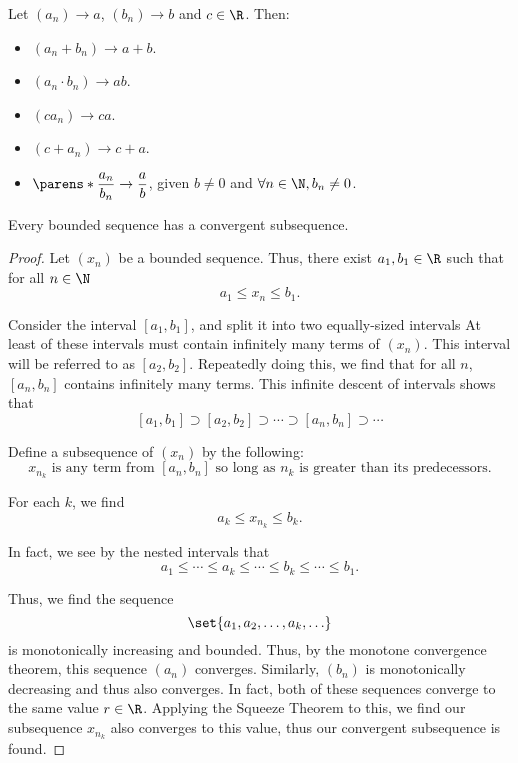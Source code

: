\documentclass{article}
\begin{document}
\begin{theorem}
  Let $(a_{n}) \to a$, $(b_{n}) \to b$ and $c \in \R$.
  Then:
  \begin{itemize}
    \item $(a_{n} + b_{n}) \to a + b$.
    \item $(a_{n} \cdot b_{n}) \to ab$.
    \item $(ca_{n}) \to ca$.
    \item $(c + a_{n}) \to c + a$.
    \item $\parens*{\dfrac{a_{n}}{b_{n}}} \to \dfrac{a}{b}$, given $b \ne 0$ and $\forall n \in \N, b_{n} \ne 0$.
  \end{itemize}

\end{theorem}

\begin{theorem}
  Every bounded sequence has a convergent subsequence.

  \begin{proof}
    Let $(x_{n})$ be a bounded sequence.
    Thus, there exist $a_{1}, b_{1} \in \R$ such that for all $n \in \N$
    \[
      a_{1} \le x_{n} \le b_{1}.
    \]

    Consider the interval $[a_{1}, b_{1}]$, and split it into two equally-sized intervals
    At least of these intervals must contain infinitely many terms of $(x_{n})$.
    This interval will be referred to as $[a_{2}, b_{2}]$.
    Repeatedly doing this, we find that for all $n$, $[a_{n}, b_{n}]$ contains infinitely many terms.
    This infinite descent of intervals shows that
    \[
      [a_{1}, b_{1}] \supset [a_{2}, b_{2}] \supset \cdots \supset [a_{n}, b_{n}] \supset \cdots
    \]

    Define a subsequence of $(x_{n})$ by the following:
    \[
      x_{n_{k}} \textrm{ is any term from } [a_{n}, b_{n}] \textrm{ so long as } n_{k} \textrm { is greater than its predecessors}.
    \]

    For each $k$, we find
    \[
      a_{k} \le x_{n_{k}} \le b_{k}.
    \]

    In fact, we see by the nested intervals that
    \[
      a_{1} \le \cdots \le a_{k} \le \cdots \le b_{k} \le \cdots \le b_{1}.
    \]

    Thus, we find the sequence
    \[
      \set{a_{1}, a_{2}, \ldots, a_{k}, \ldots}
    \]
    is monotonically increasing and bounded.
    Thus, by the monotone convergence theorem, this sequence $(a_{n})$ converges.
    Similarly, $(b_{n})$ is monotonically decreasing and thus also converges.
    In fact, both of these sequences converge to the same value $r \in \R$.
    Applying the Squeeze Theorem to this, we find our subsequence $x_{n_{k}}$ also converges to this value,
    thus our convergent subsequence is found.
  \end{proof}
\end{theorem}
\end{document}
